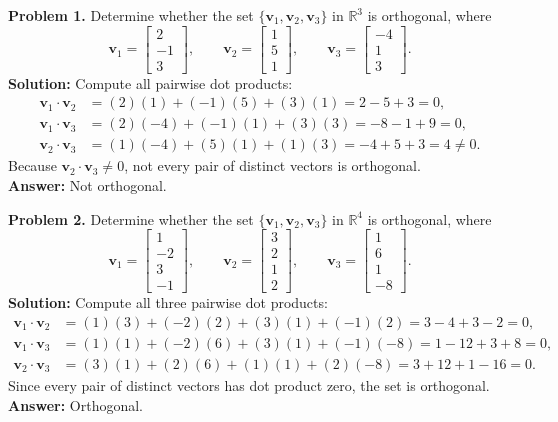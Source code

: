 \documentclass[11pt, letterpaper]{article}
\theoremstyle{definition}
\theoremstyle{remark}
\begin{document}
\textbf{Problem 1.} Determine whether the set $\{\mathbf{v}_1, \mathbf{v}_2, \mathbf{v}_3\}$ in $\mathbb{R}^3$ is orthogonal, where
\[
\mathbf{v}_1 = \begin{bmatrix} 2 \\ -1 \\ 3 \end{bmatrix}, \qquad
\mathbf{v}_2 = \begin{bmatrix} 1 \\ 5 \\ 1 \end{bmatrix}, \qquad
\mathbf{v}_3 = \begin{bmatrix} -4 \\ 1 \\ 3 \end{bmatrix}.
\]
\textbf{Solution:} Compute all pairwise dot products:
\begin{align*}
\mathbf{v}_1 \cdot \mathbf{v}_2 &= (2)(1) + (-1)(5) + (3)(1) = 2 - 5 + 3 = 0, \\
\mathbf{v}_1 \cdot \mathbf{v}_3 &= (2)(-4) + (-1)(1) + (3)(3) = -8 - 1 + 9 = 0, \\
\mathbf{v}_2 \cdot \mathbf{v}_3 &= (1)(-4) + (5)(1) + (1)(3) = -4 + 5 + 3 = 4 \neq 0.
\end{align*}
Because $\mathbf{v}_2 \cdot \mathbf{v}_3 \neq 0$, not every pair of distinct vectors is orthogonal. \\
\textbf{Answer:} Not orthogonal.

\textbf{Problem 2.} Determine whether the set $\{\mathbf{v}_1, \mathbf{v}_2, \mathbf{v}_3\}$ in $\mathbb{R}^4$ is orthogonal, where
\[
\mathbf{v}_1 = \begin{bmatrix} 1 \\ -2 \\ 3 \\ -1 \end{bmatrix}, \qquad
\mathbf{v}_2 = \begin{bmatrix} 3 \\ 2 \\ 1 \\ 2 \end{bmatrix}, \qquad
\mathbf{v}_3 = \begin{bmatrix} 1 \\ 6 \\ 1 \\ -8 \end{bmatrix}.
\]
\textbf{Solution:} Compute all three pairwise dot products:
\begin{align*}
\mathbf{v}_1 \cdot \mathbf{v}_2 &= (1)(3) + (-2)(2) + (3)(1) + (-1)(2) = 3 - 4 + 3 - 2 = 0, \\
\mathbf{v}_1 \cdot \mathbf{v}_3 &= (1)(1) + (-2)(6) + (3)(1) + (-1)(-8) = 1 - 12 + 3 + 8 = 0, \\
\mathbf{v}_2 \cdot \mathbf{v}_3 &= (3)(1) + (2)(6) + (1)(1) + (2)(-8) = 3 + 12 + 1 - 16 = 0.
\end{align*}
Since every pair of distinct vectors has dot product zero, the set is orthogonal. \\
\textbf{Answer:} Orthogonal.
\end{document}
